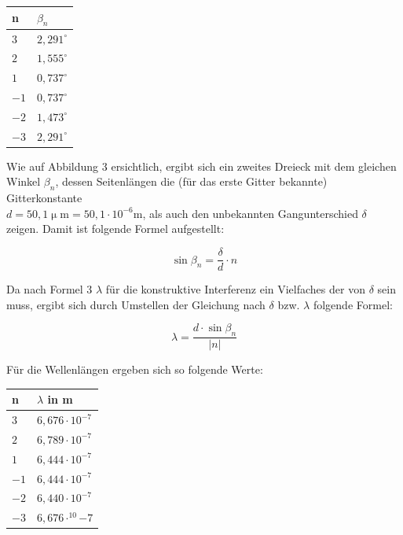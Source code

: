 \documentclass[12pt,a4paper,titlepage,headinclude,bibtotoc]{scrartcl}
\begin{document}
\begin{table} [h]
\centering
\begin{tabular}{|p{4 cm}||p{4 cm}|}
        \hline
		n& $\beta_n$\\
         \hline 
         $3$ & $2,291^\circ$  \\
         \hline
         $2$ & $1,555^\circ$\\
         \hline
         $1$ & $0,737^\circ$ \\
         \hline
         $-1$ & $0,737^\circ$ \\
         \hline
         $-2$ & $1,473^\circ$ \\
         \hline             
         $-3$ & $2,291^\circ$ \\
         \hline
\end{tabular}
\end{table}

Wie auf Abbildung 3 ersichtlich, ergibt sich ein zweites Dreieck mit dem gleichen Winkel $\beta_n$, dessen Seitenlängen die (für das erste Gitter bekannte) Gitterkonstante\\ $d= 50,1 \upmu \mathrm{m} =50,1\cdot10^{-6} \mathrm{m}$, als auch den unbekannten Gangunterschied $\delta$ zeigen. Damit ist folgende Formel aufgestellt:

\begin{equation}
\sin{\beta_n}=\frac{\delta}{d}\cdot n
\end{equation}

Da nach Formel 3 $\lambda$ für die konstruktive Interferenz ein Vielfaches der von $\delta$ sein muss, ergibt sich durch Umstellen der Gleichung nach $\delta$ bzw. $\lambda$ folgende Formel:

\begin{equation}
\lambda = \frac{d\cdot \sin\beta_n}{|n|}
\end{equation}

Für die Wellenlängen ergeben sich so folgende Werte:

\begin{table} [h]
\centering
\begin{tabular}{|p{4 cm}||p{4 cm}|}
        \hline
		n& $\lambda$ in m\\
         \hline 
         $3$ & $6,676\cdot10^{-7}$  \\
         \hline
         $2$ & $6,789\cdot10^{-7}$\\
         \hline
         $1$ & $6,444\cdot10^{-7}$ \\
         \hline
         $-1$ & $6,444\cdot10^{-7}$ \\
         \hline
         $-2$ & $6,440\cdot10^{-7}$ \\
         \hline             
         $-3$ & $6,676\cdot^10{-7}$ \\
         \hline
\end{tabular}
\end{table}
\end{document}
